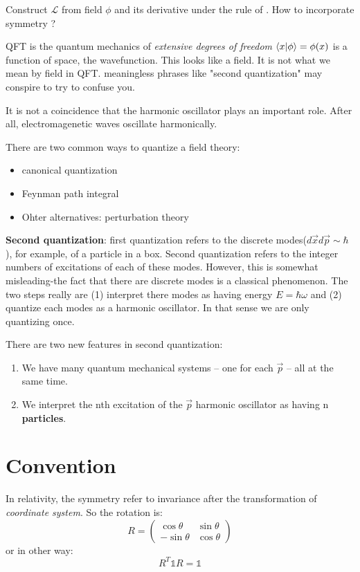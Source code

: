 Construct $\mathcal{L}$ from field $\phi$ and its derivative under the rule
of \LI{}. How to incorporate symmetry ?

QFT is the quantum mechanics of {\Large \textit{extensive degrees of freedom}}
$\bra{x}\ket{\phi} = \phi(x)$ is a function of space, the wavefunction.
This looks like a field. It is not what we mean by field in QFT.
meaningless phrases like "second quantization" may conspire to try
to confuse you.

It is not a coincidence that the harmonic oscillator plays an important
role. After all, electromagenetic waves oscillate harmonically.

There are two common ways to quantize a field theory:
\begin{itemize}
    \item canonical quantization
    \item Feynman path integral
    \item Ohter alternatives: perturbation theory
\end{itemize}

\textbf{Second quantization}: first quantization refers to the discrete
modes($d\vec{x}d\vec{p}\sim \hbar$), for example, of a particle in a box.
Second quantization refers to the integer numbers of excitations of each of
these modes. However, this is somewhat misleading-the fact that there are
discrete modes is a classical phenomenon. The two steps really are (1)
interpret there modes as having energy $E=\hbar\omega$ and (2) quantize each
modes as a harmonic oscillator. In that sense we are only quantizing once.

There are two new features in second quantization:
\begin{enumerate}
    \item We have many quantum mechanical systems – one for each $\vec{p}$  – all at the same time.
    \item We interpret the nth excitation of the $\vec{p}$  harmonic
	oscillator as having n \textbf{particles}.
\end{enumerate}
\section{Convention}
In relativity, the symmetry refer to invariance after the transformation of
\emph{coordinate system}. So the rotation is:
\begin{equation}
    R = 
	\begin{pmatrix}
	    \cos\theta	& \sin\theta	\\
	    -\sin\theta	& \cos\theta
	\end{pmatrix}
\end{equation}
or in other way:
\[ R^{T}\mathds{1}R = \mathds{1} \]
    
